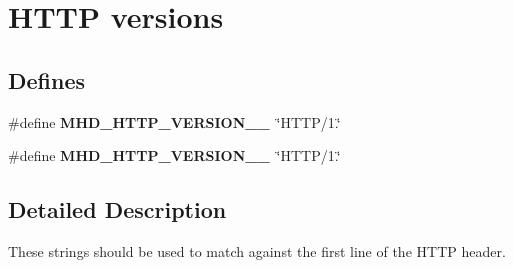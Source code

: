 \hypertarget{group__versions}{\section{\-H\-T\-T\-P versions}
\label{group__versions}
}
\subsection*{\-Defines}
\begin{DoxyCompactItemize}
\item 
\hypertarget{group__versions_ga57d093a70224f5e272b4e30ec53fc0a3}{\#define {\bfseries \-M\-H\-D\-\_\-\-H\-T\-T\-P\-\_\-\-V\-E\-R\-S\-I\-O\-N\-\_\-\_}~\char`\"{}\-H\-T\-T\-P/1.\char`\"{}}\label{group__versions_ga57d093a70224f5e272b4e30ec53fc0a3}

\item 
\hypertarget{group__versions_ga5e8934362c0b39783fcb8c102c9dc00d}{\#define {\bfseries \-M\-H\-D\-\_\-\-H\-T\-T\-P\-\_\-\-V\-E\-R\-S\-I\-O\-N\-\_\-\_}~\char`\"{}\-H\-T\-T\-P/1.\char`\"{}}\label{group__versions_ga5e8934362c0b39783fcb8c102c9dc00d}

\end{DoxyCompactItemize}


\subsection{\-Detailed \-Description}
\-These strings should be used to match against the first line of the \-H\-T\-T\-P header. 